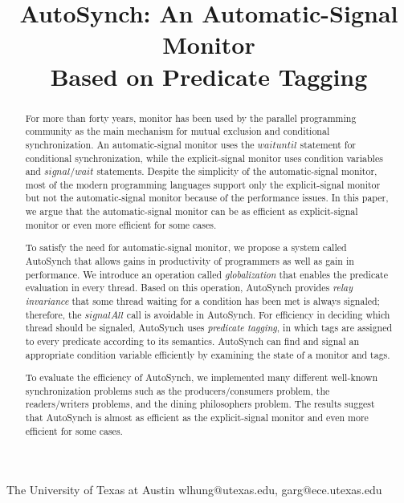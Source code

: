 \documentclass[preprint]{sigplanconf}
\begin{document}
\copyrightdata{[to be supplied]} 


\title{AutoSynch: An Automatic-Signal Monitor \\ Based on Predicate Tagging}
\subtitle{}

           {The University of Texas at Austin}
           {wlhung@utexas.edu, garg@ece.utexas.edu}

\maketitle

\begin{abstract}
For more than forty years, monitor has been used by the parallel programming 
community as the main mechanism for mutual exclusion and conditional 
synchronization. An 
automatic-signal monitor uses the $waituntil$ statement for conditional 
synchronization, while the explicit-signal monitor uses condition variables and 
$signal/wait$ statements. Despite the simplicity of the automatic-signal monitor, 
most of the modern programming languages support only the explicit-signal 
monitor but not the automatic-signal monitor because of the performance issues. 
In this paper, we argue that the automatic-signal monitor can be as efficient 
as explicit-signal monitor or even more efficient for some cases.

To satisfy the need for automatic-signal monitor, we propose a system called 
AutoSynch that allows gains in productivity of 
programmers as well as gain in performance. We introduce an operation called
{\em globalization} that enables the predicate evaluation in
every thread. Based on this operation, AutoSynch provides {\em relay invariance}
that some thread waiting for a condition has been met is always signaled; 
therefore, the $signalAll$ call is avoidable in AutoSynch. For efficiency in 
deciding which thread should be signaled, AutoSynch uses 
{\em predicate tagging}, in which tags are assigned to every predicate according
to its semantics. AutoSynch can find and signal an appropriate condition 
variable efficiently by examining the state of a monitor and tags. 

To evaluate the efficiency of AutoSynch, we implemented many different 
well-known synchronization problems such as the producers/consumers problem,
the readers/writers problems, and the dining philosophers problem. The results
suggest that AutoSynch is almost as efficient as the explicit-signal monitor
and even more efficient for some cases. 

\end{abstract}
\end{document}
